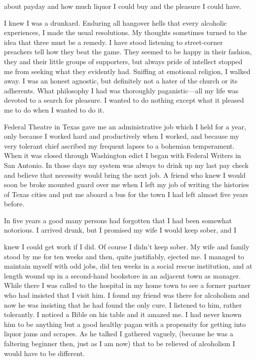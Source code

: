 about payday and how much liquor I could buy and the pleasure I could have.

I knew I was a drunkard. Enduring all hangover hells that every alcoholic experiences, I made the usual resolutions. My thoughts sometimes turned to the idea that three must be a remedy. I have stood listening to street-corner preachers tell how they beat the game. They seemed to be happy in their fashion, they and their little groups of supporters, but always pride of intellect stopped me from seeking what they evidently had. Sniffing at emotional religion, I walked away. I was an honest agnostic, but definitely not a hater of the church or its adherents. What philosophy I had was thoroughly paganistic—all my life was devoted to a search for pleasure. I wanted to do nothing except what it pleased me to do when I wanted to do it.

Federal Theatre in Texas gave me an administrative job which I held for a year, only because I worked hard and productively when I worked, and because my very tolerant chief ascribed my frequent lapses to a bohemian temperament. When it was closed through Washington edict I began with Federal Writers in San Antonio. In those days my system was always to drink up my last pay check and believe that necessity would bring the next job. A friend who knew I would soon be broke mounted guard over me when I left my job of writing the histories of Texas cities and put me aboard a bus for the town I had left almost five years before.

In five years a good many persons had forgotten that I had been somewhat notorious. I arrived drunk, but I promised my wife I would keep sober, and I

knew I could get work if I did. Of course I didn’t keep sober. My wife and family stood by me for ten weeks and then, quite justifiably, ejected me. I managed to maintain myself with odd jobs, did ten weeks in a social rescue institution, and at length wound up in a second-hand bookstore in an adjacent town as manager. While there I was called to the hospital in my home town to see a former partner who had insisted that I visit him. I found my friend was there for alcoholism and now he was insisting that he had found the only cure. I listened to him, rather tolerantly. I noticed a Bible on his table and it amazed me. I had never known him to be anything but a good healthy pagan with a propensity for getting into liquor jams and scrapes. As he talked I gathered vaguely, (because he was a faltering beginner then, just as I am now) that to be relieved of alcoholism I would have to be different.

